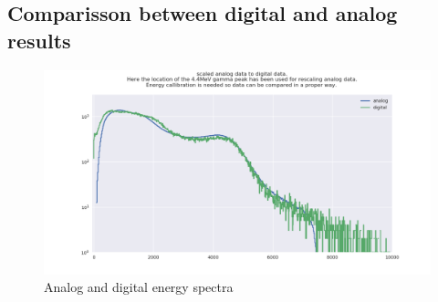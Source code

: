 \documentclass[main.tex]{subfiles}
\begin{document}
\subsection{Comparisson between digital and analog results}
\begin{figure}[ht]
    \centering
        \includegraphics[scale=.5]{CompareResults/qdc_comp.png}
        \caption{Analog and digital energy spectra}
    \label{fig:AD_QDC}
\end{figure}
\end{document}
